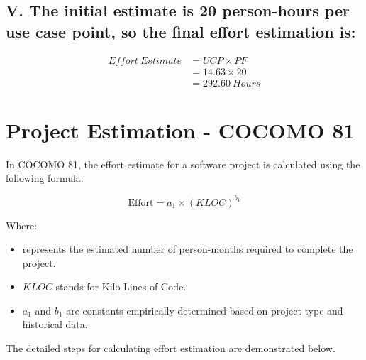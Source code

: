 \documentclass[english,12pt,a4paper]{report}
\begin{document}
		
		\subsection*{V. The initial estimate is 20 person-hours per use case point, so the final effort estimation is:}
		\begin{equation}
			\begin{aligned}
				Effort\ Estimate&= UCP \times PF \\
				&= 14.63 \times 20 \\
				&= 292.60\ Hours
			\end{aligned}
		\end{equation}
	
	
	\section{Project Estimation - COCOMO 81}
	In COCOMO 81, the effort estimate for a software project is calculated using the following formula:
	
	\begin{equation}
		\text{Effort} = a_1 \times (KLOC)^{b_1}
	\end{equation}
	
	Where:
	
	\begin{itemize}
		\item {} represents the estimated number of person-months required to complete the project.
		\item $KLOC$ stands for Kilo Lines of Code.
		\item $a_1$ and $b_1$ are constants empirically determined based on project type and historical data.
		
	\end{itemize}
	
	The detailed steps for calculating effort estimation are demonstrated below.
	
\end{document}
